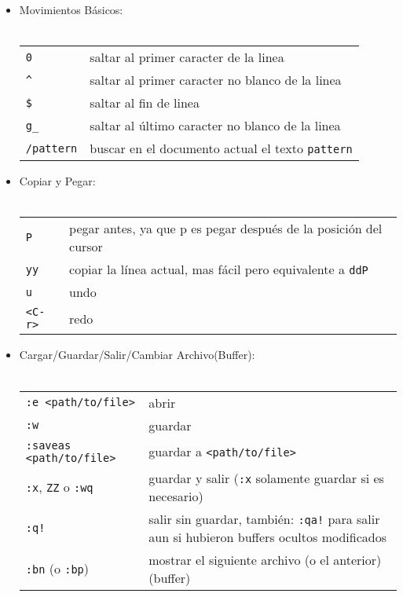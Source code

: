 \begin{itemize}
	\item Movimientos Básicos: \\ \\
\begin{tabular}{ l l }
            \texttt{0} & saltar al primer caracter de la linea \\
            \texttt{\^} & saltar al primer caracter no blanco de la linea \\
            \texttt{\$} & saltar al fin de linea \\
            \texttt{g\_} & saltar al último caracter no blanco de la linea \\
            \texttt{/pattern} & buscar en el documento actual el texto \texttt{pattern} \\
\end{tabular}
\end{itemize}



\begin{itemize}
	\item Copiar y Pegar: \\ \\
\begin{tabular}{ l l }
            \texttt{P} & pegar antes, ya que p es pegar después de la posición del cursor \\
            \texttt{yy} & copiar la línea actual, mas fácil pero equivalente a \texttt{ddP} \\
            \texttt{u} & undo \\
            \texttt{<C-r>} & redo \\
\end{tabular}
\end{itemize}


\begin{itemize}
	\item Cargar/Guardar/Salir/Cambiar Archivo(Buffer): \\ \\
\begin{tabular}{ l l }
            \texttt{:e <path/to/file>} & abrir \\
            \texttt{:w} & guardar \\
            \texttt{:saveas <path/to/file>} & guardar a \texttt{<path/to/file>} \\
            \texttt{:x}, \texttt{ZZ} o \texttt{:wq} & guardar y salir (\texttt{:x} solamente guardar si es necesario) \\
            \texttt{:q!} & salir sin guardar, también: \texttt{:qa!} para salir aun si hubieron buffers ocultos modificados \\
            \texttt{:bn} (o \texttt{:bp}) & mostrar el siguiente archivo (o el anterior) (buffer) \\
\end{tabular}
\end{itemize}



